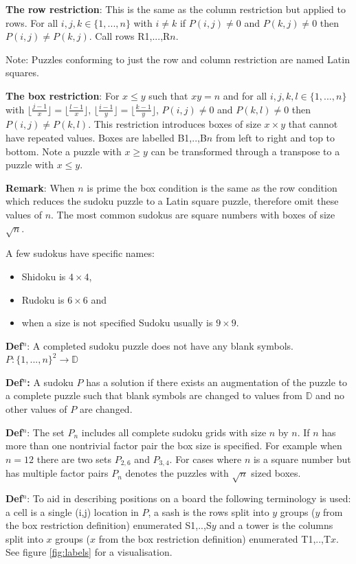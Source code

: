 \documentclass[a4paper,11pt]{report}
\newcounter{row}
\newcounter{col}
\begin{document}
\textbf{The row restriction}: This is the same as the column restriction but applied to rows. For all $i,j,k\in \{1,...,n\}$ with $i\neq k$ if $P(i,j)\neq0$ and $P(k,j)\neq0$ then $P(i,j)\neq P(k,j)$. Call rows R1,...,R$n$.

Note: Puzzles conforming to just the row and column restriction are named Latin squares. 

\textbf{The box restriction}: For $x\leq y$ such that $xy=n$ and for all $i,j,k,l\in\{1,...,n\}$ with $\lfloor \frac{j-1}{x} \rfloor=\lfloor \frac{l-1}{x}\rfloor$, $\lfloor \frac{i-1}{y} \rfloor=\lfloor \frac{k-1}{y}\rfloor$, $P(i,j)\neq0$ and $P(k,l)\neq0$ then $P(i,j)\neq P(k,l)$. This restriction introduces boxes of size $x\times y$ that cannot have repeated values. Boxes are labelled B1,..,B$n$ from left to right and top to bottom. Note a puzzle with $x\geq y$ can be transformed through a transpose to a puzzle with $x\leq y$. 

\textbf{Remark}: When $n$ is prime the box condition is the same as the row condition which reduces the sudoku puzzle to a Latin square puzzle, therefore omit these values of $n$. The most common sudokus are square numbers with boxes of size $\sqrt{n}$. 

A few sudokus have specific names:
\begin{itemize}
\item Shidoku is $4\times 4$,
\item Rudoku is $6\times 6$ and
\item when a size is not specified Sudoku usually is $9\times 9$.
\end{itemize} 

\textbf{Def$^n$}: A completed sudoku puzzle does not have any blank symbols. $P: \{1,...,n\}^2\rightarrow\mathbb D$ 

\textbf{Def$^n$:} A sudoku $P$ has a solution if there exists an augmentation of the puzzle to a complete puzzle such that blank symbols are changed to values from $\mathbb D$ and no other values of $P$ are changed.

\textbf{Def$^n$}: The set $P_n$ includes all complete sudoku grids with size $n$ by $n$. If $n$ has more than one nontrivial factor pair the box size is specified. For example when $n=12$ there are two sets $P_{2,6}$ and $P_{3,4}$. For cases where $n$ is a square number but has multiple factor pairs $P_n$ denotes the puzzles with $\sqrt{n}$ sized boxes.

\textbf{Def$^n$}: To aid in describing positions on a board the following terminology is used: a cell is a single (i,j) location in $P$, a sash is the rows split into $y$ groups ($y$ from the box restriction definition) enumerated S1,..,S$y$ and a tower is the columns split into $x$ groups ($x$ from the box restriction definition) enumerated T1,..,T$x$. See figure \ref{fig:labels} for a visualisation.
\end{document}
